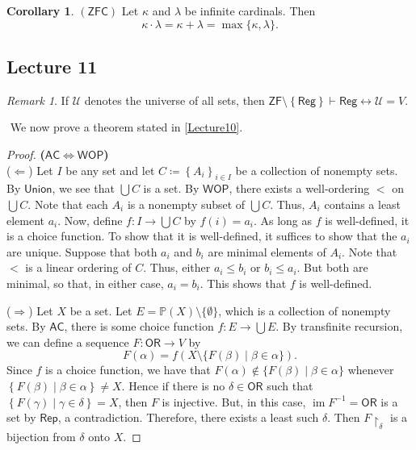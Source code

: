 \documentclass[10pt,letterpaper,cm]{nupset}
\theoremstyle{definition}
\theoremstyle{theorem}
\newtheorem{corollary}[definition]{Corollary}
\theoremstyle{remark}
\newtheorem{remark}[definition]{Remark}
\newcommand{\U}{\mathcal U}
\renewcommand{\P}{\mathbb P}
\newcommand{\1}{\mathbf{1}}
\newcommand{\0}{\vec 0}
\newcommand{\zf}{\mathsf{ZF}}
\newcommand{\zfc}{\mathsf{ZFC}}
\newcommand{\ac}{\mathsf{AC}}
\newcommand{\ord}{\mathsf{OR}}
\DeclareMathOperator{\im}{im}
\begin{document}
\begin{corollary}{$(\zfc)$}
Let $\kappa$ and $\lambda$ be infinite cardinals.
Then $$\kappa \cdot \lambda = \kappa + \lambda = \max\{\kappa, \lambda\}.$$
\end{corollary}

\subsection{Lecture 11}

\begin{remark}
If $\U$ denotes the universe of all sets, then $\zf \setminus \left\{\mathsf{Reg}\right\} \vdash \mathsf{Reg} \leftrightarrow \U = V$.
\end{remark}$ $
We now prove a theorem stated in \cref{Lecture10}.

\begin{proof}{\textbf{($\ac \iff \mathsf{WOP}$)}}$ $\\ 
($\Longleftarrow$) Let $I$ be any set and let $C\coloneqq \left\{A_i\right\}_{i\in I}$ be a collection of nonempty sets. By  $\mathsf{Union}$, we see that $\bigcup C$ is a set. By $\mathsf{WOP}$, there exists a well-ordering $<$ on $\bigcup C$. Note that each $A_i$ is a nonempty subset of $\bigcup C$. Thus, $A_i$ contains a least element $a_i$. Now, define $f: I \rightarrow \bigcup C$ by $f(i)=a_i$. As long as $f$ is well-defined, it is a choice function. To show that it is well-defined, it suffices to show that the $a_i$ are unique. Suppose that both $a_i$ and $b_i$ are minimal elements of $A_i$. Note  that $<$ is a linear ordering of $C$. Thus, either $a_i \leq b_i$ or $b_i\leq a_i$. But both are minimal, so that, in either case, $a_i=b_i$. This shows that $f$ is well-defined.

\smallskip

($\Longrightarrow$) Let $X$ be a set. Let $E = \P(X) \setminus \{\emptyset\}$, which is a collection of nonempty sets. By $\ac$, there is some choice function $f : E \to \bigcup{E}$.  By transfinite recursion, we can define a sequence $F : \ord \to V$ by 
$$ F(\alpha) = f(X \setminus \{F(\beta) \mid \beta \in \alpha \})   .$$ Since $f$ is a choice function, we have that $F(\alpha) \notin \{F(\beta) \mid \beta \in \alpha\}$ whenever $\left\{F(\beta) \mid \beta \in \alpha\right\} \ne X$. Hence if there is no $\delta \in \ord$ such that $\left\{F(\gamma) \mid \gamma \in \delta\right\} =X$, then $F$ is injective. But, in this case, $\im{F^{-1}} = \ord$ is a set by $\mathsf{Rep}$, a contradiction. Therefore, there exists a least such $\delta$. Then $F\restriction_{\delta}$ is a bijection from $\delta$ onto $X$.
\end{proof}
\end{document}
